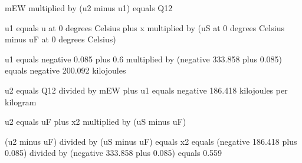 mEW multiplied by (u2 minus u1) equals Q12  

u1 equals u at 0 degrees Celsius plus x multiplied by (uS at 0 degrees Celsius minus uF at 0 degrees Celsius)  

u1 equals negative 0.085 plus 0.6 multiplied by (negative 333.858 plus 0.085) equals negative 200.092 kilojoules  

u2 equals Q12 divided by mEW plus u1 equals negative 186.418 kilojoules per kilogram  

u2 equals uF plus x2 multiplied by (uS minus uF)  

(u2 minus uF) divided by (uS minus uF) equals x2 equals (negative 186.418 plus 0.085) divided by (negative 333.858 plus 0.085) equals 0.559